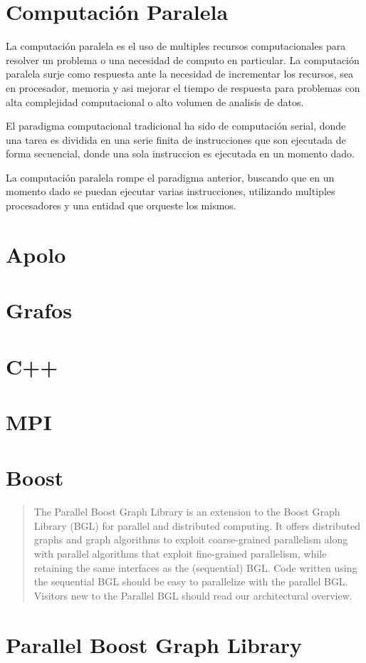 
	\section{Computación Paralela}

	La computación paralela es el uso de multiples recursos computacionales para resolver un problema o una necesidad de computo en particular. La computación paralela surje como respuesta ante la necesidad de incrementar los recursos, sea en procesador, memoria y asi mejorar el tiempo de respuesta para problemas con alta complejidad computacional o alto volumen de analisis de datos. 

	El paradigma computacional tradicional ha sido de computación serial, donde una tarea es dividida en una serie finita de instrucciones que son ejecutada de forma secuencial, donde una sola instruccion es ejecutada en un momento dado. 

	La computación paralela rompe el paradigma anterior, buscando que en un momento dado se puedan ejecutar varias instrucciones, utilizando multiples procesadores y una entidad que orqueste los mismos.  

	\cite{PCI}
	\cite{SC}

	\section{Apolo}

	\section{Grafos}

	\section{C++}

	\section{MPI}

	\section{Boost}

		\begin{quotation}
		The Parallel Boost Graph Library is an extension to the Boost Graph Library (BGL) for parallel and distributed computing. It offers distributed graphs and graph algorithms to exploit coarse-grained parallelism along with parallel algorithms that exploit fine-grained parallelism, while retaining the same interfaces as the (sequential) BGL. Code written using the sequential BGL should be easy to parallelize with the parallel BGL. Visitors new to the Parallel BGL should read our architectural overview.\cite{wwwBoost} 
		\end{quotation} 


	\section{Parallel Boost Graph Library}

